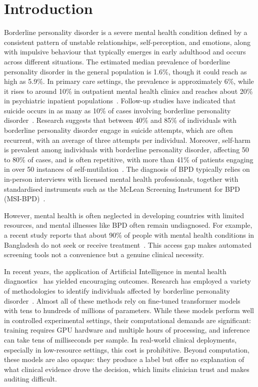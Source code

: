 \documentclass[11pt]{article}
\providecommand{\citealp}[1]{\cite{#1}}
\begin{document}
\section{Introduction}\label{sec:intro}

Borderline personality disorder is a severe mental health condition defined by a consistent
pattern of unstable relationships, self-perception, and emotions, along with impulsive behaviour
that typically emerges in early adulthood and occurs across different situations. The estimated
median prevalence of borderline personality disorder in the general population is 1.6\%, though
it could reach as high as 5.9\%. In primary care settings, the prevalence is approximately 6\%,
while it rises to around 10\% in outpatient mental health clinics and reaches about 20\% in
psychiatric inpatient populations~\cite{dsm}. Follow-up studies have indicated that suicide
occurs in as many as 10\% of cases involving borderline personality
disorder~\citealp{paris2001,stone1990}. Research suggests that between 40\% and 85\% of
individuals with borderline personality disorder engage in suicide attempts, which are often
recurrent, with an average of three attempts per individual. Moreover, self-harm is prevalent
among individuals with borderline personality disorder, affecting 50 to 80\% of cases, and is
often repetitive, with more than 41\% of patients engaging in over 50 instances of
self-mutilation~\cite{oumaya2008}. The diagnosis of BPD typically relies on in-person interviews
with licensed mental health professionals, together with standardised instruments such as the
McLean Screening Instrument for BPD (MSI-BPD)~\cite{zanarini2003}.

However, mental health is often neglected in developing countries with limited resources, and
mental illnesses like BPD often remain undiagnosed. For example, a recent study reports that
about 90\% of people with mental health conditions in Bangladesh do not seek or receive
treatment~\cite{huque2025}. This access gap makes automated screening tools not a convenience
but a genuine clinical necessity.

In recent years, the application of Artificial Intelligence in mental health
diagnostics~\cite{sr2024,lawrence2024,perlis2024} has yielded encouraging outcomes. Research has
employed a variety of methodologies to identify individuals affected by borderline personality
disorder~\cite{lahnakoski2024,arango2024,nazari2024}. Almost all of these methods rely on
fine-tuned transformer models with tens to hundreds of millions of parameters. While these models
perform well in controlled experimental settings, their computational demands are significant:
training requires GPU hardware and multiple hours of processing, and inference can take tens of
milliseconds per sample. In real-world clinical deployments, especially in low-resource settings,
this cost is prohibitive. Beyond computation, these models are also opaque: they produce a label
but offer no explanation of what clinical evidence drove the decision, which limits clinician
trust and makes auditing difficult.
\end{document}
